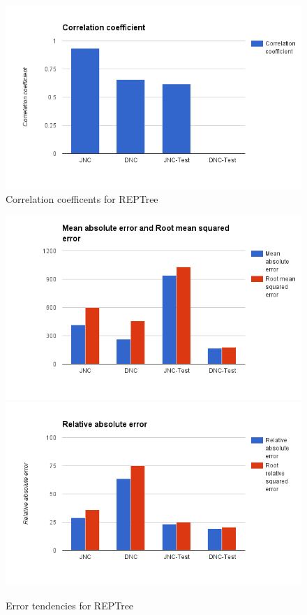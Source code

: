 \begin{figure}[h]
\centering
\includegraphics[scale=0.4]{figures/REPTree_1.png} 
\caption{Correlation coefficents for REPTree}
\label{fig:correl_reptree}
\end{figure}

\begin{figure}[h]
\centering
\includegraphics[scale=0.4]{figures/REPTree_2.png} 
\includegraphics[scale=0.4]{figures/REPTree_3.png} 
\caption{Error tendencies for REPTree}
\label{fig:error_reptree}
\end{figure}

